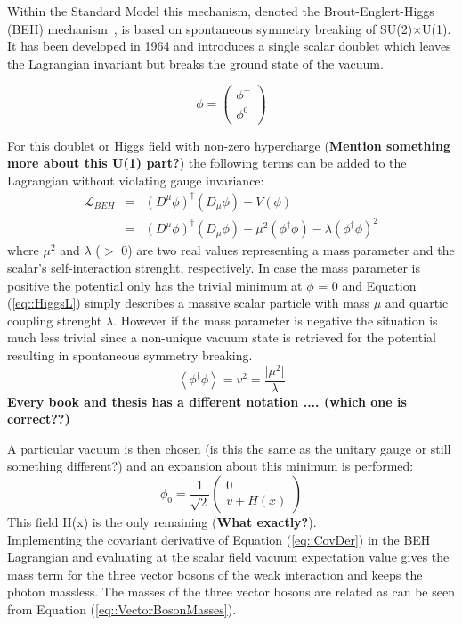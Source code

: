Within the Standard Model this mechanism, denoted the Brout-Englert-Higgs (BEH) mechanism~\cite{Englert, Higgs, Kibble}, is based on spontaneous symmetry breaking of SU(2)$\times$U(1). It has been developed in 1964 and introduces a single scalar doublet which leaves the Lagrangian invariant but breaks the ground state of the vacuum.

\begin{equation}
 \phi = \begin{pmatrix}
            \phi^{+} \\
            \phi^{0}
           \end{pmatrix}
\end{equation}

For this doublet or Higgs field with non-zero hypercharge (\textbf{Mention something more about this U(1) part?}) the following terms can be added to the Lagrangian without violating gauge invariance: 
\begin{eqnarray} \label{eq::HiggsL}
 \mathcal{L}_{BEH} & = & (D^{\mu} \phi)^{\dagger}(D_{\mu} \phi) - V(\phi) \nonumber \\
                   & = & (D^{\mu} \phi)^{\dagger}(D_{\mu} \phi) - \mu^{2} (\phi^{\dagger} \phi) - \lambda (\phi^{\dagger} \phi)^{2}
\end{eqnarray}
where $\mu^{2}$ and $\lambda$ ($>$ 0) are two real values representing a mass parameter and the scalar's self-interaction strenght, respectively.
In case the mass parameter is positive the potential only has the trivial minimum at $\phi$ = 0 and Equation (\ref{eq::HiggsL}) simply describes a massive scalar particle with mass $\mu$ and quartic coupling strenght $\lambda$. However if the mass parameter is negative the situation is much less trivial since a non-unique vacuum state is retrieved for the potential resulting in spontaneous symmetry breaking.
\begin{equation}
 \left< \phi^{\dagger} \phi \right> = v^{2} = \frac{\vert \mu^{2} \vert}{\lambda}
\end{equation}
\textbf{Every book and thesis has a different notation .... (which one is correct??)}

A particular vacuum is then chosen (is this the same as the unitary gauge or still something different?) and an expansion about this minimum is performed:
\begin{equation}
 \phi_{0} = \frac{1}{\sqrt{2}}\begin{pmatrix}
             0 \\
             v + H(x)
            \end{pmatrix}
\end{equation}
This field H(x) is the only remaining (\textbf{What exactly?}).\\
Implementing the covariant derivative of Equation (\ref{eq::CovDer}) in the BEH Lagrangian and evaluating at the scalar field vacuum expectation value gives the mass term for the three vector bosons of the weak interaction and keeps the photon massless. The masses of the three vector bosons are related as can be seen from Equation (\ref{eq::VectorBosonMasses}).


